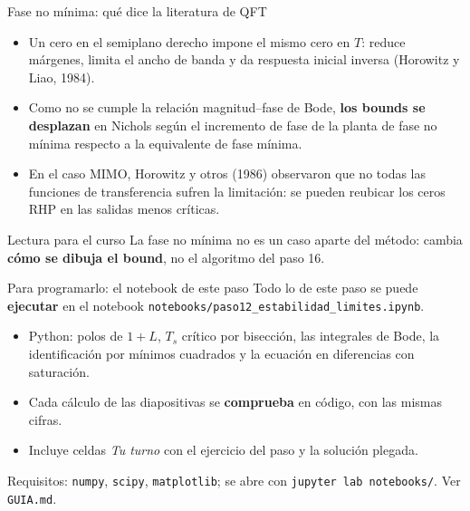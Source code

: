 \documentclass[aspectratio=169,11pt]{beamer}
\begin{document}
\begin{frame}{Fase no mínima: qué dice la literatura de QFT}
  \small
  \begin{itemize}
    \item Un cero en el semiplano derecho impone el mismo cero en $T$: reduce márgenes, limita el ancho de banda y da respuesta inicial inversa (Horowitz y Liao, 1984).
    \item Como no se cumple la relación magnitud--fase de Bode, \textbf{los bounds se desplazan} en Nichols según el incremento de fase de la planta de fase no mínima respecto a la equivalente de fase mínima.
    \item En el caso MIMO, Horowitz y otros (1986) observaron que no todas las funciones de transferencia sufren la limitación: se pueden reubicar los ceros RHP en las salidas menos críticas.
  \end{itemize}
  \begin{alertblock}{Lectura para el curso}
    La fase no mínima no es un caso aparte del método: cambia \textbf{cómo se dibuja el bound}, no el algoritmo del paso 16.
  \end{alertblock}
\end{frame}

\begin{frame}{Para programarlo: el notebook de este paso}
  \small
  Todo lo de este paso se puede \textbf{ejecutar} en el notebook \texttt{notebooks/paso12\_estabilidad\_limites.ipynb}.
  \begin{itemize}
    \item Python: polos de $1+L$, $T_s$ crítico por bisección, las integrales de Bode, la identificación por mínimos cuadrados y la ecuación en diferencias con saturación.
    \item Cada cálculo de las diapositivas se \textbf{comprueba} en código, con las mismas cifras.
    \item Incluye celdas \emph{Tu turno} con el ejercicio del paso y la solución plegada.
  \end{itemize}
  \footnotesize Requisitos: \texttt{numpy}, \texttt{scipy}, \texttt{matplotlib}; se abre con \texttt{jupyter lab notebooks/}. Ver \texttt{GUIA.md}.
\end{frame}
\end{document}
